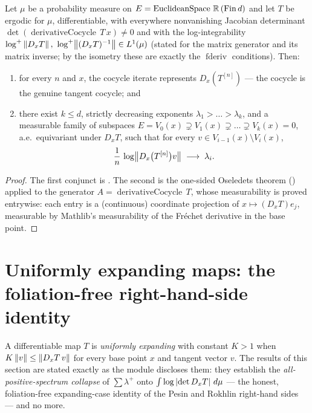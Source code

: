 \begin{theorem}\label{oseledets_filtration_derivativeCocycle}
  \leanok
  Let \(\mu\) be a probability measure on \(E = \operatorname{EuclideanSpace}\,\mathbb{R}\,(\operatorname{Fin} d)\) and
  let \(T\) be ergodic for \(\mu\), differentiable, with everywhere nonvanishing Jacobian
  determinant \(\det(\operatorname{derivativeCocycle}\,T\,x)\ne 0\) and with the log-integrability
  \(\log^{+}\norm{D_xT},\ \log^{+}\bignorm{(D_xT)^{-1}}\in L^1(\mu)\) (stated for the matrix
  generator and its matrix inverse; by the isometry these are exactly the \(\operatorname{fderiv}\)
  conditions). Then:
  \begin{enumerate}
    \item for every \(n\) and \(x\), the cocycle iterate represents \(D_x(T^{[n]})\) --- the
      cocycle is the genuine tangent cocycle; and
    \item there exist \(k\le d\), strictly decreasing exponents
      \(\lambda_1 > \dots > \lambda_k\), and a measurable family of subspaces
      \(E = V_0(x) \supsetneq V_1(x) \supsetneq \dots \supsetneq V_k(x) = 0\), a.e.\
      equivariant under \(D_xT\), such that for every \(v\in V_{i-1}(x)\setminus V_i(x)\),
      \[
        \frac1n\,\log\bigl\lVert D_x\bigl(T^{[n]}\bigr)v \bigr\rVert \;\longrightarrow\; \lambda_i .
      \]
  \end{enumerate}
\end{theorem}
\begin{proof}\leanok
  The first conjunct is . The second is the one-sided Oseledets theorem
  (\Cref{oseledets_filtration}) applied to the generator
  \(A = \operatorname{derivativeCocycle}\,T\), whose measurability is proved entrywise: each
  entry is a (continuous) coordinate projection of \(x\mapsto (D_xT)e_j\), measurable by
  Mathlib's measurability of the Fr\'echet derivative in the base point.
\end{proof}

\section{Uniformly expanding maps: the foliation-free right-hand-side identity}

A differentiable map \(T\) is \emph{uniformly expanding} with constant \(K > 1\) when
\(K\left\lVert v \right\rVert\le\left\lVert D_xT\,v \right\rVert\) for every base point \(x\) and tangent vector \(v\). The results of
this section are stated exactly as the module discloses them: they establish the
\emph{all-positive-spectrum collapse} of \(\sum\lambda^{+}\) onto \(\int\log\left\lvert \det D_xT \right\rvert\,d\mu\)
--- the honest, foliation-free expanding-case identity of the Pesin and Rokhlin right-hand sides
--- and no more.

